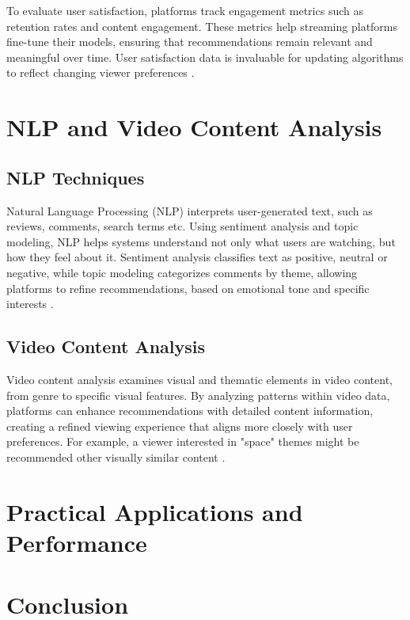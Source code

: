 \documentclass[12pt,english,a4paper]{article}
\begin{document}
\hspace*{2em}To evaluate user satisfaction, platforms track engagement metrics such as retention rates and content engagement. These metrics help streaming platforms fine-tune their models, ensuring that recommendations remain relevant and meaningful over time. User satisfaction data is invaluable for updating algorithms to reflect changing viewer preferences \cite{Souane2023}.

\section{NLP and Video Content Analysis}

\subsection{NLP Techniques}

\hspace*{2em}Natural Language Processing (NLP) interprets user-generated text, such as reviews, comments, search terms etc. Using sentiment analysis and topic modeling, NLP helps systems understand not only what users are watching, but how they feel about it. Sentiment analysis classifies text as positive, neutral or negative, while topic modeling categorizes comments by theme, allowing platforms to refine recommendations, based on emotional tone and specific interests \cite{Hande2023,Saini202312347}.

\subsection{Video Content Analysis}

\hspace*{2em}Video content analysis examines visual and thematic elements in video content, from genre to specific visual features. By analyzing patterns within video data, platforms can enhance recommendations with detailed content information, creating a refined viewing experience that aligns more closely with user preferences. For example, a viewer interested in "space" themes might be recommended other visually similar content \cite{Souane2023,Saini202312347}.

\section{Practical Applications and Performance}

\section{Conclusion}

\newpage

\printbibliography
\end{document}
